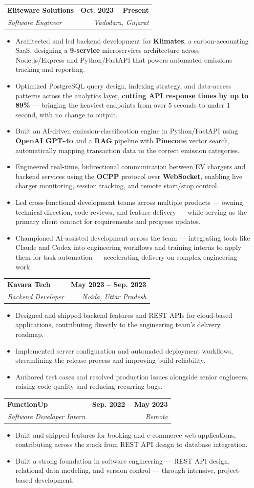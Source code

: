 \documentclass[letterpaper,11pt]{article}
\makeatletter
\newcommand{\resumeItem}[1]{
  \item\small{
    {#1 \vspace{-2pt}}
  }
}
\newcommand{\resumeSubheading}[4]{
  \vspace{-2pt}\item
    \begin{tabular*}{1.0\textwidth}[t]{l@{\extracolsep{\fill}}r}
      \textbf{#1} & \textbf{\small #2} \\
      \textit{\small#3} & \textit{\small #4} \\
    \end{tabular*}\vspace{-7pt}
}
\newcommand{\resumeItemListStart}{\begin{itemize}}
\newcommand{\resumeItemListEnd}{\end{itemize}\vspace{-5pt}}
\makeatother
\begin{document}
    \resumeSubheading
      {Eliteware Solutions}{Oct. 2023 -- Present}
      {Software Engineer}{Vadodara, Gujarat}
      \resumeItemListStart
        \resumeItem{Architected and led backend development for \textbf{Klimates}, a carbon-accounting SaaS, designing a \textbf{9-service} microservices architecture across Node.js/Express and Python/FastAPI that powers automated emissions tracking and reporting.}
        \resumeItem{Optimized PostgreSQL query design, indexing strategy, and data-access patterns across the analytics layer, \textbf{cutting API response times by up to 89\%} --- bringing the heaviest endpoints from over 5 seconds to under 1 second, with no change to output.}
        \resumeItem{Built an AI-driven emission-classification engine in Python/FastAPI using \textbf{OpenAI GPT-4o} and a \textbf{RAG} pipeline with \textbf{Pinecone} vector search, automatically mapping transaction data to the correct emission categories.}
        \resumeItem{Engineered real-time, bidirectional communication between EV chargers and backend services using the \textbf{OCPP} protocol over \textbf{WebSocket}, enabling live charger monitoring, session tracking, and remote start/stop control.}
        \resumeItem{Led cross-functional development teams across multiple products --- owning technical direction, code reviews, and feature delivery --- while serving as the primary client contact for requirements and progress updates.}
        \resumeItem{Championed AI-assisted development across the team --- integrating tools like Claude and Codex into engineering workflows and training interns to apply them for task automation --- accelerating delivery on complex engineering work.}
      \resumeItemListEnd

    \resumeSubheading
      {Kavara Tech}{May 2023 -- Sep. 2023}
      {Backend Developer}{Noida, Uttar Pradesh}
      \resumeItemListStart
        \resumeItem{Designed and shipped backend features and REST APIs for cloud-based applications, contributing directly to the engineering team's delivery roadmap.}
        \resumeItem{Implemented server configuration and automated deployment workflows, streamlining the release process and improving build reliability.}
        \resumeItem{Authored test cases and resolved production issues alongside senior engineers, raising code quality and reducing recurring bugs.}
      \resumeItemListEnd

    \resumeSubheading
      {FunctionUp}{Sep. 2022 -- May 2023}
      {Software Developer Intern}{Remote}
      \resumeItemListStart
        \resumeItem{Built and shipped features for booking and e-commerce web applications, contributing across the stack from REST API design to database integration.}
        \resumeItem{Built a strong foundation in software engineering --- REST API design, relational data modeling, and version control --- through intensive, project-based development.}
      \resumeItemListEnd
\end{document}
